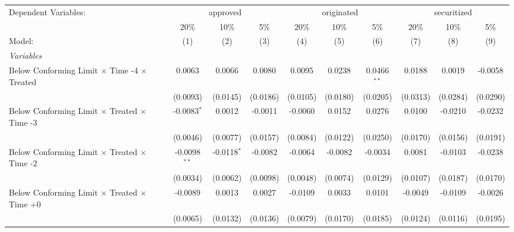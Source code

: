 \begingroup
\centering
\begin{tabular}{lccccccccc}
   \tabularnewline \midrule \midrule
   Dependent Variables: & \multicolumn{3}{c}{approved} & \multicolumn{3}{c}{originated} & \multicolumn{3}{c}{securitized}\\
                                                              & 20\%           & 10\%           & 5\%           & 20\%           & 10\%           & 5\%           & 20\%         & 10\%      & 5\% \\    
   Model:                                                     & (1)            & (2)            & (3)           & (4)            & (5)            & (6)           & (7)          & (8)       & (9)\\  
   \midrule
   \emph{Variables}\\
   Below Conforming Limit $\times$ Time -4 $\times$ Treated   & 0.0063         & 0.0066         & 0.0080        & 0.0095         & 0.0238         & 0.0466$^{**}$ & 0.0188       & 0.0019    & -0.0058\\   
                                                              & (0.0093)       & (0.0145)       & (0.0186)      & (0.0105)       & (0.0180)       & (0.0205)      & (0.0313)     & (0.0284)  & (0.0290)\\   
   Below Conforming Limit $\times$ Treated $\times$ Time -3   & -0.0083$^{*}$  & 0.0012         & -0.0011       & -0.0060        & 0.0152         & 0.0276        & 0.0100       & -0.0210   & -0.0232\\   
                                                              & (0.0046)       & (0.0077)       & (0.0157)      & (0.0084)       & (0.0122)       & (0.0250)      & (0.0170)     & (0.0156)  & (0.0191)\\   
   Below Conforming Limit $\times$ Treated $\times$ Time -2   & -0.0098$^{**}$ & -0.0118$^{*}$  & -0.0082       & -0.0064        & -0.0082        & -0.0034       & 0.0081       & -0.0103   & -0.0238\\   
                                                              & (0.0034)       & (0.0062)       & (0.0098)      & (0.0048)       & (0.0074)       & (0.0129)      & (0.0107)     & (0.0187)  & (0.0170)\\   
   Below Conforming Limit $\times$ Treated $\times$ Time +0   & -0.0089        & 0.0013         & 0.0027        & -0.0109        & 0.0033         & 0.0101        & -0.0049      & -0.0109   & -0.0026\\   
                                                              & (0.0065)       & (0.0132)       & (0.0136)      & (0.0079)       & (0.0170)       & (0.0185)      & (0.0124)     & (0.0116)  & (0.0195)\\   

\end{tabular}
